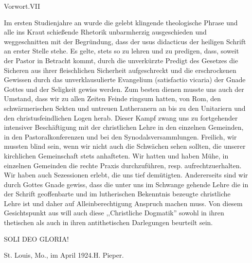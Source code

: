 \noindent Vorwort.\hfill VII

Im ersten Studienjahre an wurde die gelebt klingende theologische Phrase und alle ins Kraut schießende Rhetorik unbarmherzig ausgeschieden und weggeschnitten mit der Begründung, dass der usus didacticus der heiligen Schrift an erster Stelle stehe. Es gelte, stets so zu lehren und zu predigen, dass, soweit der Pastor in Betracht kommt, durch die unverkürzte Predigt des Gesetzes die Sicheren aus ihrer fleischlichen Sicherheit aufgeschreckt und die erschrockenen Gewissen durch das unverklausulierte Evangelium (satisfactio vicaria) der Gnade Gottes und der Seligkeit gewiss werden. Zum besten dienen musste uns auch der Umstand, dass wir zu allen Zeiten Feinde ringsum hatten, von Rom, den schwärmerischen Sekten und untreuen Lutheranern an bis zu den Unitariern und den christusfeindlichen Logen herab. Dieser Kampf zwang uns zu fortgehender intensiver Beschäftigung mit der christlichen Lehre in den einzelnen Gemeinden, in den Pastoralkonferenzen und bei den Synodalsversammlungen. Freilich, wir mussten blind sein, wenn wir nicht auch die Schwächen sehen sollten, die unserer kirchlichen Gemeinschaft stets anhafteten. Wir hatten und haben Mühe, in einzelnen Gemeinden die rechte Praxis durchzuführen, resp. aufrechtzuerhalten. Wir haben auch Sezessionen erlebt, die uns tief demütigten. Andererseits sind wir durch Gottes Gnade gewiss, dass die unter uns im Schwange gehende Lehre die in der Schrift geoffenbarte und im lutherischen Bekenntnis bezeugte christliche Lehre ist und daher auf Alleinberechtigung Anspruch machen muss. Von diesem Gesichtspunkt aus will auch diese ,,Christliche Dogmatik'' sowohl in ihren thetischen als auch in ihren antithetischen Darlegungen beurteilt sein.

\vspace{1em}
\centering SOLI DEO GLORIA!

\vspace{1em}
\noindent St. Louis, Mo., im April 1924.\hfill H. Pieper.